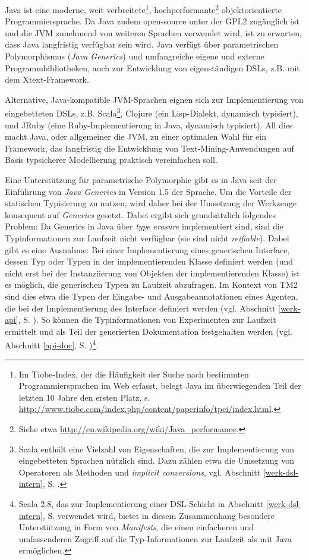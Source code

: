 \documentclass[abstracton, 12pt]{scrartcl}
\begin{document}
Java ist eine moderne, weit verbreitete\footnote{Im Tiobe-Index, der die Häufigkeit der Suche nach bestimmten Programmiersprachen im Web erfasst, belegt Java im überwiegenden Teil der letzten 10 Jahre den ersten Platz, s. \url{http://www.tiobe.com/index.php/content/paperinfo/tpci/index.html}.}, hochperformante\footnote{Siehe etwa \url{http://en.wikipedia.org/wiki/Java_performance}.} objektorientierte Programmiersprache. Da Java zudem open-source unter der GPL2 zugänglich ist und die JVM zunehmend von weiteren Sprachen verwendet wird, ist zu erwarten, dass Java langfristig verfügbar sein wird. Java verfügt über parametrischen Polymorphismus (\emph{Java Generics}) und umfangreiche eigene und externe Programmbibliotheken, auch zur Entwicklung von eigenständigen DSLs, z.B. mit dem Xtext-Framework.

Alternative, Java-kompatible JVM-Sprachen eignen sich zur Implementierung von eingebetteten DSLs, z.B. Scala\footnote{Scala enthält eine Vielzahl von Eigenschaften, die zur Implementierung von eingebetteten Sprachen nützlich sind. Dazu zählen etwa die Umsetzung von Operatoren als Methoden und \emph{implicit conversions}, vgl. Abschnitt \ref{werk-dsl-intern}, S. \pageref{werk-dsl-intern}.}, Clojure (ein Lisp-Dialekt, dynamisch typisiert), und JRuby (eine Ruby-Im\-ple\-men\-tier\-ung in Java, dynamisch typisiert). All dies macht Java, oder allgemeiner die JVM, zu einer optimalen Wahl für ein Framework, das langfristig die Entwicklung von Text-Mining-Anwendungen auf Basis typsicherer Modellierung praktisch vereinfachen soll.

Eine Unterstützung für parametrische Polymorphie gibt es in Java seit der Einführung von \emph{Java Generics} in Version 1.5 der Sprache. Um die Vorteile der statischen Typisierung zu nutzen, wird daher bei der Umsetzung der Werkzeuge konsequent auf \emph{Generics} gesetzt. Dabei ergibt sich grundsätzlich folgendes Problem: Da Generics in Java über \emph{type erasure} implementiert sind, sind die Typinformationen zur Laufzeit nicht verfügbar (sie sind nicht \emph{reifiable}). Dabei gibt es eine Ausnahme: Bei einer Implementierung eines generischen Interface, dessen Typ oder Typen in der implementierenden Klasse definiert werden (und nicht erst bei der Instanziierung von Objekten der implementierenden Klasse) ist es möglich, die generischen Typen zu Laufzeit abzufragen. Im Kontext von TM2 sind dies etwa die Typen der Eingabe- und Ausgabeannotationen eines Agenten, die bei der Implementierung des Interface definiert werden (vgl. Abschnitt \ref{werk-api}, S. \pageref{werk-api}). So können die Typinformationen von Experimenten zur Laufzeit ermittelt und als Teil der generierten Dokumentation festgehalten werden (vgl. Abschnitt \ref{api-doc}, S. \pageref{api-doc})\footnote{Scala 2.8, das zur Implementierung einer DSL-Schicht in Abschnitt \ref{werk-dsl-intern}, S. \pageref{werk-dsl-intern} verwendet wird, bietet in diesem Zusammenhang besondere Unterstützung in Form von \emph{Manifests}, die einen einfacheren und umfassenderen Zugriff auf die Typ-Informationen zur Laufzeit als mit Java ermöglichen.}.
\end{document}
